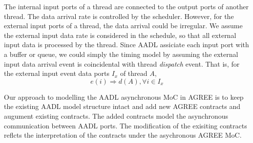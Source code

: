 The internal input ports of a thread are connected to the output ports of another thread. The data arrival rate is controlled by the scheduler. However, for the external input ports of a thread, the data arrival could be irregular. We assume the external input data rate is considered in the schedule, so that all external input data is processed by the thread. Since AADL assiciate each input port with a buffer or queue, we could simply the timing model by assuming the external input data arrival event is coincidental with thread \emph{dispatch} event. That is, for the external input event data ports $I_x$ of thread $A$, 
$$ e(i) \Rightarrow d(A), \forall i \in I_x $$





Our approach to modelling the AADL asynchronous MoC in AGREE is to keep the existing AADL model structure intact and add new AGREE contracts and augument existing contracts. The added contracts model the asynchronous communication between AADL ports. The modification of the exisiting contracts reflcts the interpretation of the contracts under the asychronous AGREE MoC. 



